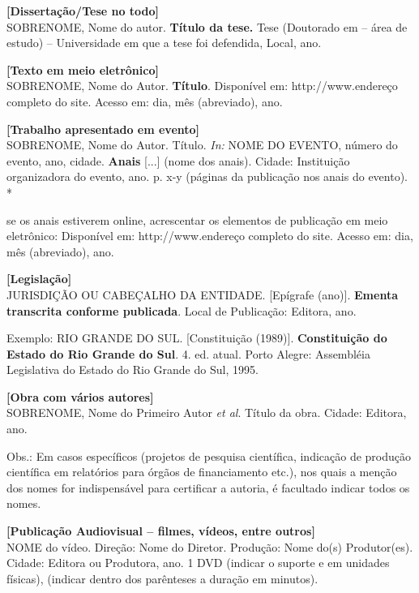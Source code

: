 \bigskip
\noindent\textcolor{docblue}{\textbf{[Dissertação/Tese no todo]}}\\
SOBRENOME, Nome do autor. \textbf{Título da tese.} Tese (Doutorado em -- área de estudo) -- Universidade em que a tese foi defendida, Local, ano.

\bigskip
\noindent\textcolor{docblue}{\textbf{[Texto em meio eletrônico]}}\\
SOBRENOME, Nome do Autor. \textbf{Título}. Disponível em: http://www.endereço completo do site. Acesso em: dia, mês (abreviado), ano.

\bigskip
\noindent\textcolor{docblue}{\textbf{[Trabalho apresentado em evento]}}\\
SOBRENOME, Nome do Autor. Título. \textit{In:} NOME DO EVENTO, número do evento, ano, cidade. \textbf{Anais} [...] (nome dos anais). Cidade: Instituição organizadora do evento, ano. p. x-y (páginas da publicação nos anais do evento). *

\medskip
\noindent * se os anais estiverem online, acrescentar os elementos de publicação em meio eletrônico: Disponível em: http://www.endereço completo do site. Acesso em: dia, mês (abreviado), ano.

\bigskip
\noindent\textcolor{docblue}{\textbf{[Legislação]}}\\
JURISDIÇÃO OU CABEÇALHO DA ENTIDADE. [Epígrafe (ano)]. \textbf{Ementa transcrita conforme publicada}. Local de Publicação: Editora, ano.

\medskip
\noindent Exemplo: RIO GRANDE DO SUL. [Constituição (1989)]. \textbf{Constituição do Estado do Rio Grande do Sul}. 4. ed. atual. Porto Alegre: Assembléia Legislativa do Estado do Rio Grande do Sul, 1995.

\bigskip
\noindent\textcolor{docblue}{\textbf{[Obra com vários autores]}}\\
SOBRENOME, Nome do Primeiro Autor \textit{et al}. Título da obra. Cidade: Editora, ano.

\medskip
\noindent Obs.: Em casos específicos (projetos de pesquisa científica, indicação de produção científica em relatórios para órgãos de financiamento etc.), nos quais a menção dos nomes for indispensável para certificar a autoria, é facultado indicar todos os nomes.

\bigskip
\noindent\textcolor{docblue}{\textbf{[Publicação Audiovisual -- filmes, vídeos, entre outros]}}\\
NOME do vídeo. Direção: Nome do Diretor. Produção: Nome do(s) Produtor(es). Cidade: Editora ou Produtora, ano. 1 DVD (indicar o suporte e em unidades físicas), (indicar dentro dos parênteses a duração em minutos).

